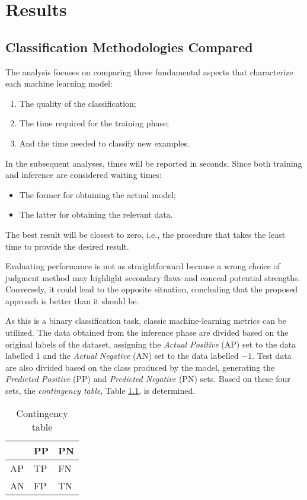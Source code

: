 \chapter{Results}

\section{Classification Methodologies Compared}\label{sec:qsvm-res}

The analysis focuses on comparing three fundamental aspects that characterize each machine learning model:
\begin{enumerate}
    \item The quality of the classification;
    \item The time required for the training phase;
    \item And the time needed to classify new examples.
\end{enumerate}

In the subsequent analyses, times will be reported in seconds. Since both training and inference are considered waiting times: 
\begin{itemize}
    \item The former for obtaining the actual model;
    \item The latter for obtaining the relevant data.
\end{itemize}

The best result will be closest to zero, i.e., the procedure that takes the least time to provide the desired result.

Evaluating performance is not as straightforward because a wrong choice of judgment method may highlight secondary flaws and conceal potential strengths. Conversely, it could lead to the opposite situation, concluding that the proposed approach is better than it should be.

As this is a binary classification task, classic machine-learning metrics can be utilized. The data obtained from the inference phase are divided based on the original labels of the dataset, assigning the \emph{Actual Positive} (AP) set to the data labelled $1$ and the \emph{Actual Negative} (AN) set to the data labelled $-1$. Test data are also divided based on the class produced by the model, generating the \emph{Predicted Positive} (PP) and \emph{Predicted Negative} (PN) sets. Based on these four sets, the \emph{contingency table}, Table \ref{tab:contingency}, is determined.

\begin{table}[H]
    \centering
    \begin{tabular}{l|ll}
       & PP & PN \\\hline
    AP & TP & FN \\
    AN & FP & TN
    \end{tabular}
    \caption{Contingency table}
    \label{tab:contingency}
\end{table}

